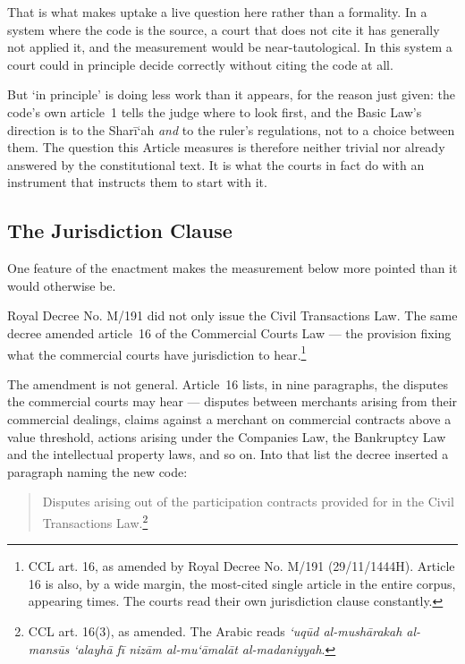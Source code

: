 \documentclass[12pt]{article}
\begin{document}
That is what makes uptake a live question here rather than a formality. In a
system where the code is the source, a court that does not cite it has
generally not applied it, and the measurement would be near-tautological. In
this system a court could in principle decide correctly without citing the
code at all.

But `in principle' is doing less work than it appears, for the reason just
given: the code's own article~1 tells the judge where to look first, and the
Basic Law's direction is to the Shar\=i`ah \emph{and} to the ruler's
regulations, not to a choice between them. The question this Article measures
is therefore neither trivial nor already answered by the constitutional text.
It is what the courts in fact do with an instrument that instructs them to
start with it.

\subsection{The Jurisdiction Clause}

One feature of the enactment makes the measurement below more pointed than it
would otherwise be.

Royal Decree No. M/191 did not only issue the Civil Transactions Law. The same
decree amended article~16 of the Commercial Courts Law --- the provision
fixing what the commercial courts have jurisdiction to
hear.\footnote{CCL art. 16, as amended by Royal Decree No. M/191 (29/11/1444H).
Article 16 is also, by a wide margin, the most-cited single article in the
entire corpus, appearing \nTopArticleCitations{} times. The courts read their
own jurisdiction clause constantly.}

The amendment is not general. Article~16 lists, in nine paragraphs, the
disputes the commercial courts may hear --- disputes between merchants arising
from their commercial dealings, claims against a merchant on commercial
contracts above a value threshold, actions arising under the Companies Law,
the Bankruptcy Law and the intellectual property laws, and so on. Into that
list the decree inserted a paragraph naming the new code:

\begin{quote}
\singlespacing\small
Disputes arising out of the participation contracts provided for in the Civil
Transactions Law.\footnote{CCL art. 16(3), as amended. The Arabic reads
\emph{`uq\=ud al-mush\=arakah al-mans\=us `alayh\=a f\=i niz\=am
al-mu`\=amal\=at al-madaniyyah}.}
\end{quote}
\end{document}
